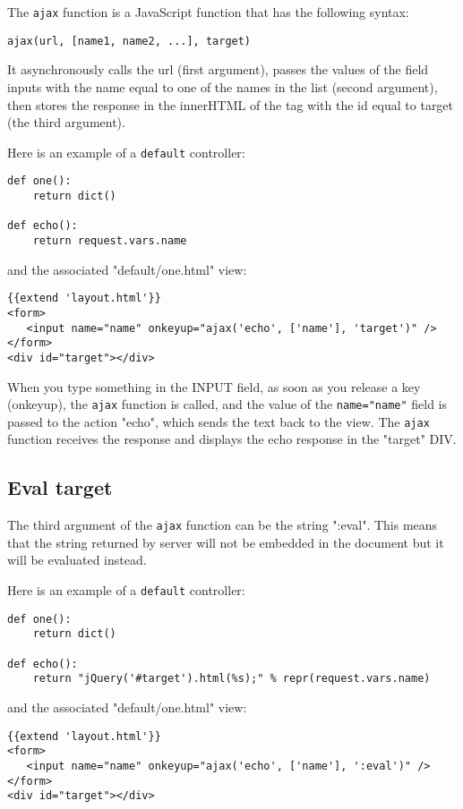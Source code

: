 \documentclass[justified,sixbynine,notoc]{tufte-book}
\def\ft{\small\tt}
\begin{document}
\begin{fullwidth}
The {\ft ajax} function is a JavaScript function that has the following syntax:
\begin{lstlisting}
ajax(url, [name1, name2, ...], target)
\end{lstlisting}

It asynchronously calls the url (first argument), passes the values of the field inputs with the name equal to one of the names in the list (second argument), then stores the response in the innerHTML of the tag with the id equal to target (the third argument).

Here is an example of a {\ft default} controller:
\begin{lstlisting}
def one():
    return dict()

def echo():
    return request.vars.name
\end{lstlisting}
\noindent and the associated "default/one.html" view:
\begin{lstlisting}[keywords={}]
{{extend 'layout.html'}}
<form>
   <input name="name" onkeyup="ajax('echo', ['name'], 'target')" />
</form>
<div id="target"></div>
\end{lstlisting}

When you type something in the INPUT field, as soon as you release a key (onkeyup), the {\ft ajax} function is called, and the value of the {\ft name="name"} field is passed to the action "echo", which sends the text back to the view. The {\ft ajax} function receives the response and displays the echo response in the "target" DIV.

\goodbreak\subsection{Eval target}

The third argument of the {\ft ajax} function can be the string ":eval". This means that the string returned by server will not be embedded in the document but it will be evaluated instead.

Here is an example of a {\ft default} controller:
\begin{lstlisting}
def one():
    return dict()

def echo():
    return "jQuery('#target').html(%s);" % repr(request.vars.name)
\end{lstlisting}
\noindent and the associated "default/one.html" view:
\begin{lstlisting}[keywords={}]
{{extend 'layout.html'}}
<form>
   <input name="name" onkeyup="ajax('echo', ['name'], ':eval')" />
</form>
<div id="target"></div>
\end{lstlisting}


\end{fullwidth}
\end{document}
